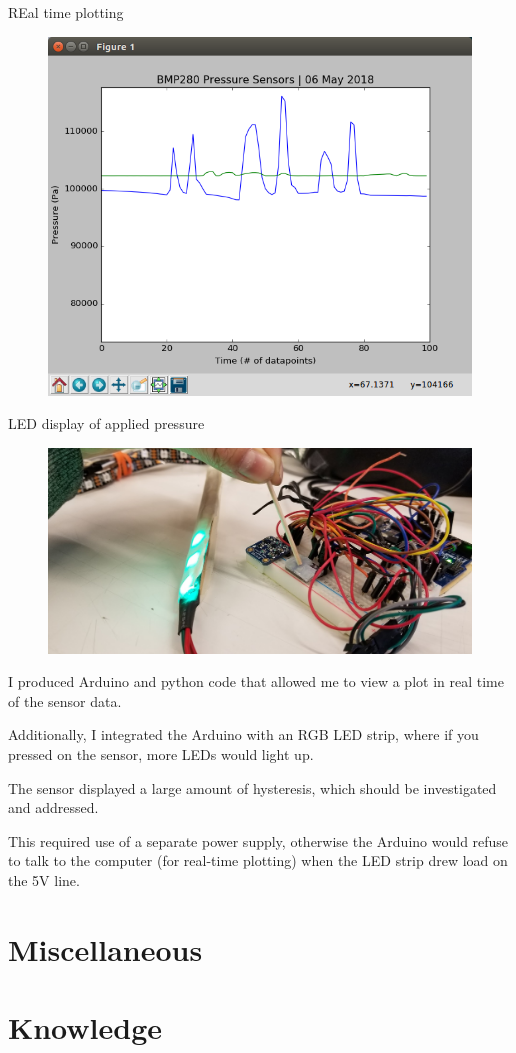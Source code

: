 \documentclass[preprint,12pt,3p]{elsarticle}
\begin{document}
REal time plotting
\begin{figure}[H]
\centering
\includegraphics[width=.5\textwidth]{images/sensor/analog_plot.png}
\end{figure}

LED display of applied pressure
\begin{figure}[H]
\centering
\includegraphics[width=.8\textwidth]{images/sensor/poke.jpg}
\end{figure}




I produced Arduino and python code that allowed me to view a plot in real time of the sensor data.

Additionally, I integrated the Arduino with an RGB LED strip, where if you pressed on the sensor,
more LEDs would light up.

The sensor displayed a large amount of hysteresis, which should be investigated and addressed.

This required use of a separate power supply, otherwise the Arduino would refuse to talk to the
computer (for real-time plotting) when the LED strip drew load on the 5V line.

\section{Miscellaneous}
\section{Knowledge}
\end{document}
